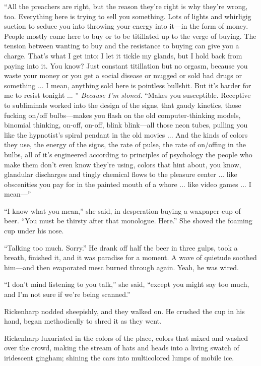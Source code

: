 ``All the preachers are right, but the reason they're right is why they're wrong, too. Everything here is trying to sell you something. Lots of lights and whirligig suction to seduce you into throwing your energy into it---in the form of money. People mostly come here to buy or to be titillated up to the verge of buying. The tension between wanting to buy and the resistance to buying can give you a charge. That's what I get into: I let it tickle my glands, but I hold back from paying into it. You know? Just constant titillation but no orgasm, because you waste your money or you get a social disease or mugged or sold bad drugs or something ... I mean, anything sold here is pointless bullshit. But it's harder for me to resist tonight ... '' \textit{Because I'm stoned.} ``Makes you susceptible. Receptive to subliminals worked into the design of the signs, that gaudy kinetics, those fucking on/off bulbs---makes you flash on the old computer-thinking models, binomial thinking, on-off, on-off, blink blink---all those neon tubes, pulling you like the hypnotist's spiral pendant in the old movies ... And the kinds of colors they use, the energy of the signs, the rate of pulse, the rate of on/offing in the bulbs, all of it's engineered according to principles of psychology the people who make them don't even know they're using, colors that hint about, you know, glandular discharges and tingly chemical flows to the pleasure center ... like obscenities you pay for in the painted mouth of a whore ... like video games ... I mean---''

``I know what you mean,'' she said, in desperation buying a waxpaper cup of beer. ``You must be thirsty after that monologue. Here.'' She shoved the foaming cup under his nose.

``Talking too much. Sorry.'' He drank off half the beer in three gulps, took a breath, finished it, and it was paradise for a moment. A wave of quietude soothed him---and then evaporated mesc burned through again. Yeah, he was wired.

``I don't mind listening to you talk,'' she said, ``except you might say too much, and I'm not sure if we're being scanned.''

Rickenharp nodded sheepishly, and they walked on. He crushed the cup in his hand, began methodically to shred it as they went.

Rickenharp luxuriated in the colors of the place, colors that mixed and washed over the crowd, making the stream of hats and heads into a living swatch of iridescent gingham; shining the cars into multicolored lumps of mobile ice.

